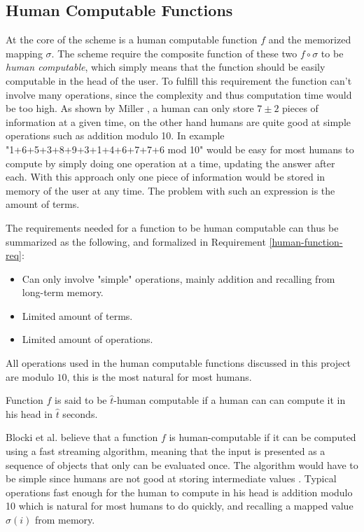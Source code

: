 \subsection{Human Computable Functions}\label{human-func}
At the core of the scheme is a human computable function $f$ and the memorized mapping $\sigma$. The scheme require the composite function of these two $f \circ \sigma$ to be \emph{human computable}, which simply means that the function should be easily computable in the head of the user. To fulfill this requirement the function can't involve many operations, since the complexity and thus computation time would be too high. As shown by Miller \cite{magic-seven_miller}, a human can only store $7 \pm 2$ pieces of information at a given time, on the other hand humans are quite good at simple operations such as addition modulo 10. In example "1+6+5+3+8+9+3+1+4+6+7+7+6 mod 10" would be easy for most humans to compute by simply doing one operation at a time, updating the answer after each. With this approach only one piece of information would be stored in memory of the user at any time. The problem with such an expression is the amount of terms. 
\par The requirements needed for a function to be human computable can thus be summarized as the following, and formalized in Requirement \ref{human-function-req}:
\begin{itemize}
    \item Can only involve "simple" operations, mainly addition and recalling from long-term memory.
    \item Limited amount of terms.
    \item Limited amount of operations.
\end{itemize}
\begin{remark}
    All operations used in the human computable functions discussed in this project are modulo $10$, this is the most natural for most humans.
\end{remark}
\begin{requirement}
    \label{human-function-req}
    Function $f$ is said to be $\hat t$-human computable if a human can can compute it in his head in $\hat t$ seconds.
\end{requirement}

\par Blocki et al. \cite{hcp-blocki} believe that a function $f$ is human-computable if it can be computed using a fast streaming algorithm, meaning that the input is presented as a sequence of objects that only can be evaluated once. The algorithm would have to be simple since humans are not good at storing intermediate values \cite{magic-seven_miller}. Typical operations fast enough for the human to compute in his head is addition modulo 10 which is natural for most humans to do quickly, and recalling a mapped value $\sigma(i)$ from memory.

